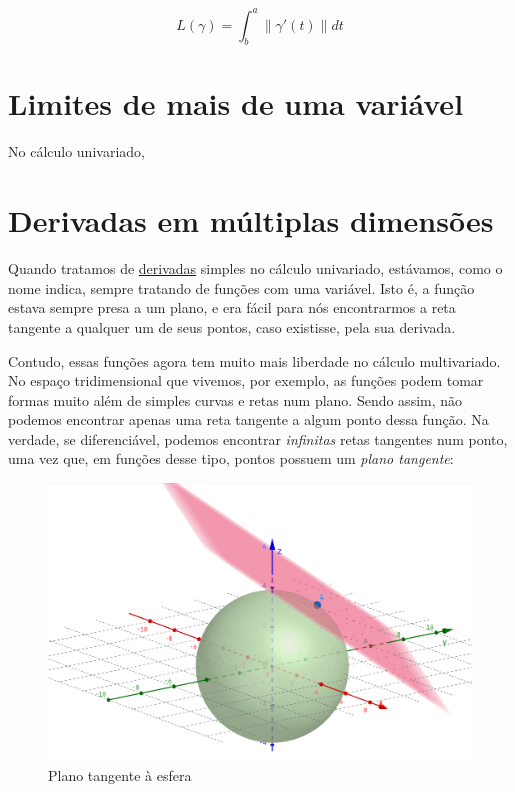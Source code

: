 \documentclass[
  letterpaper,
  DIV=11,
  numbers=noendperiod]{scrreprt}
\begin{document}
\[
L(\gamma) = \int^{a}_{b} \lVert \gamma'(t) \rVert dt
\]

\chapter{Limites de mais de uma
variável}\label{limites-de-mais-de-uma-variuxe1vel}

No cálculo univariado,

\chapter{Derivadas em múltiplas
dimensões}\label{derivadas-em-muxfaltiplas-dimensuxf5es}

Quando tratamos de \href{d-simples.qmd}{derivadas} simples no cálculo
univariado, estávamos, como o nome indica, sempre tratando de funções
com uma variável. Isto é, a função estava sempre presa a um plano, e era
fácil para nós encontrarmos a reta tangente a qualquer um de seus
pontos, caso existisse, pela sua derivada.

Contudo, essas funções agora tem muito mais liberdade no cálculo
multivariado. No espaço tridimensional que vivemos, por exemplo, as
funções podem tomar formas muito além de simples curvas e retas num
plano. Sendo assim, não podemos encontrar apenas uma reta tangente a
algum ponto dessa função. Na verdade, se diferenciável, podemos
encontrar \emph{infinitas} retas tangentes num ponto, uma vez que, em
funções desse tipo, pontos possuem um \emph{plano tangente}:

\begin{figure}[H]

{\centering \includegraphics{Imagens/esferaPlanoTangente.png}

}

\caption{Plano tangente à esfera}

\end{figure}%
\end{document}
